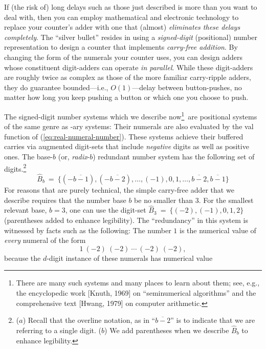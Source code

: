 \medskip

 

If (the risk of) long delays such as those just described is more than you want to deal with, then you can employ mathematical and electronic technology to replace your counter's adder with one that (almost) {\em eliminates these delays completely}.  The ``silver bullet'' resides in using a {\em signed-digit} (positional) number representation to design a counter that implements {\it carry-free addition}.  By changing the form of the numerals your counter uses, you can design adders whose constituent digit-adders can operate {\em in parallel}.  While these digit-adders are roughly twice as complex as those of the more familiar carry-ripple adders, they do guarantee bounded---i.e., $O(1)$---delay between button-pushes, no matter how long you keep
pushing a button or which one you choose to push.

\medskip


The signed-digit number systems which we describe now\footnote{There are many such systems and many places to learn about them; see, e.g., the encyclopedic work [Knuth, 1969] on ``seminumerical algorithms'' and the comprehensive text [Hwang, 1979] on computer arithmetic.}~are positional systems of the same genre as -ary systems: Their numerals are also evaluated by the {\sc val} function of (\ref{eq:real-numeral-number}).  These systems achieve their buffered carries via augmented digit-sets that include {\em negative} digits as well as positive ones.  The base-$b$ (or, {\it radix}-$b$) redundant number system  has the following set of digits.\footnote{($a$) Recall that the overline notation, as in ``$\overline{b-2}$'' is to indicate that we are referring to a single digit.  ($b$) We add parentheses when we describe $\widehat{B}_b$ to enhance legibility.}
\[ \widehat{B}_b \ = \ \{(-\overline{b-1}), (-\overline{b-2}), \ldots,
(-1), 0 , 1, \ldots, \overline{b-2}, \overline{b-1}\}
\]
For reasons that are purely technical, the simple carry-free adder that we describe requires that the number base $b$ be no smaller than $3$.  For the smallest relevant base, $b=3$, one can use the digit-set $\widehat{B}_3 \ = \ \{ (-2), (-1), 0, 1, 2\}$ (parentheses added to enhance legibility).  The ``redundancy'' in this system is witnessed by facts such as the following:  The number $1$ is the numerical value of {\em every} numeral of the form
\[ 1 \ (-2) \ (-2) \ \cdots \ (-2) \ (-2), \]
because the $d$-digit instance of these numerals has numerical value

